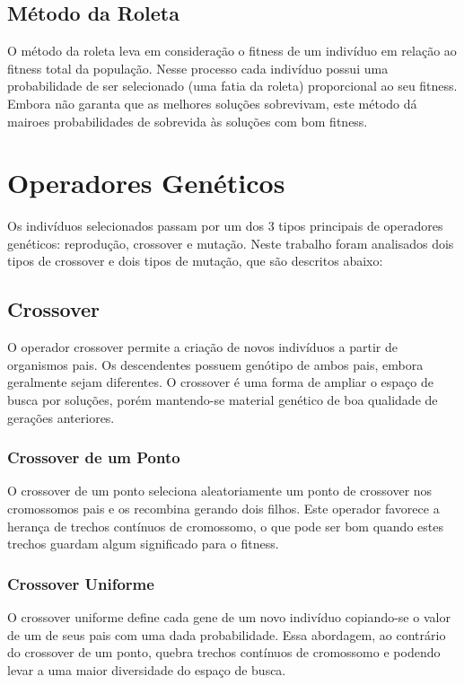 \documentclass[conference]{IEEEtran}
\begin{document}
\subsection{Método da Roleta}
O método da roleta leva em consideração o fitness de um indivíduo em relação ao
fitness total da população. Nesse processo cada indivíduo possui uma 
probabilidade de ser selecionado (uma fatia da roleta) proporcional ao seu
fitness. Embora não garanta que as melhores soluções sobrevivam, este método
dá mairoes probabilidades de sobrevida às soluções com bom fitness.

\section{Operadores Genéticos}
Os indivíduos selecionados passam por um dos 3 tipos principais de operadores
genéticos: reprodução, crossover e mutação. Neste trabalho foram analisados
dois tipos de crossover e dois tipos de mutação, que são descritos abaixo:\\

\subsection{Crossover}
O operador crossover permite a criação de novos indivíduos a partir de
organismos pais. Os descendentes possuem genótipo de ambos pais, embora
geralmente sejam diferentes. O crossover é uma forma de ampliar o espaço de
busca por soluções, porém mantendo-se material genético de boa qualidade de
gerações anteriores.

\subsubsection{Crossover de um Ponto}
O crossover de um ponto seleciona aleatoriamente um ponto de crossover nos
cromossomos pais e os recombina gerando dois filhos. Este operador favorece a
herança de trechos contínuos de cromossomo, o que pode ser bom quando estes
trechos guardam algum significado para o fitness.

\subsubsection{Crossover Uniforme}
O crossover uniforme define cada gene de um novo indivíduo copiando-se o valor
de um de seus pais com uma dada probabilidade. Essa abordagem, ao contrário do
crossover de um ponto, quebra trechos contínuos de cromossomo e podendo levar a
uma maior diversidade do espaço de busca.
\end{document}
